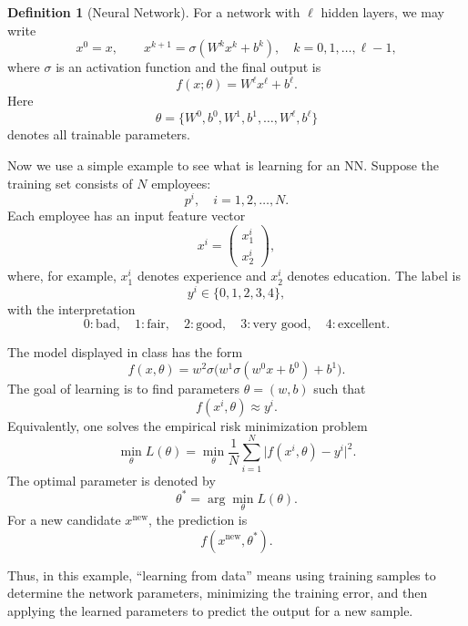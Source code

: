 \documentclass[11pt,a4paper]{article}
\theoremstyle{definition}
\newtheorem{definition}{Definition}[section]
\theoremstyle{plain}
\theoremstyle{remark}
\theoremstyle{plain}
\newcommand{\boxnote}[1]{%
  \vspace{0.5em}
  \noindent\colorbox{softblue}{\parbox{0.965\linewidth}{#1}}
  \vspace{0.5em}
}
\begin{document}
\begin{definition}[Neural Network]
    For a network with $\ell$ hidden layers, we may write
\[
  x^0=x,
  \qquad
  x^{k+1}=\sigma(W^kx^k+b^k),\quad k=0,1,\ldots,\ell-1,
\]
where $\sigma$ is an activation function and the final output is
\[
  f(x;\theta)=W^\ell x^\ell+b^\ell.
\]
Here
\[
  \theta=\{W^0,b^0,W^1,b^1,\ldots,W^\ell,b^\ell\}
\]
denotes all trainable parameters.
\end{definition}


Now we use a simple example to see what is learning for an NN. Suppose the training set consists of $N$ employees:
\[
  p^i,\quad i=1,2,\ldots,N.
\]
Each employee has an input feature vector
\[
  x^i=\begin{pmatrix}x_1^i\\x_2^i\end{pmatrix},
\]
where, for example, $x_1^i$ denotes experience and $x_2^i$ denotes education. The label is
\[
  y^i\in\{0,1,2,3,4\},
\]
with the interpretation
\[
  0:\text{bad},\quad
  1:\text{fair},\quad
  2:\text{good},\quad
  3:\text{very good},\quad
  4:\text{excellent}.
\]

The model displayed in class has the form
\[
  f(x,\theta)=w^2\sigma\bigl(w^1\sigma(w^0x+b^0)+b^1\bigr).
\]
The goal of learning is to find parameters $\theta=(w,b)$ such that
\[
  f(x^i,\theta)\approx y^i.
\]
Equivalently, one solves the empirical risk minimization problem
\[
  \min_\theta L(\theta)
  =\min_\theta \frac{1}{N}\sum_{i=1}^N
  \bigl|f(x^i,\theta)-y^i\bigr|^2.
\]
The optimal parameter is denoted by
\[
  \theta^*=\arg\min_\theta L(\theta).
\]
For a new candidate $x^{\mathrm{new}}$, the prediction is
\[
  f(x^{\mathrm{new}},\theta^*).
\]

\boxnote{Thus, in this example, ``learning from data'' means using training samples to determine the network parameters, minimizing the training error, and then applying the learned parameters to predict the output for a new sample.}
\end{document}
